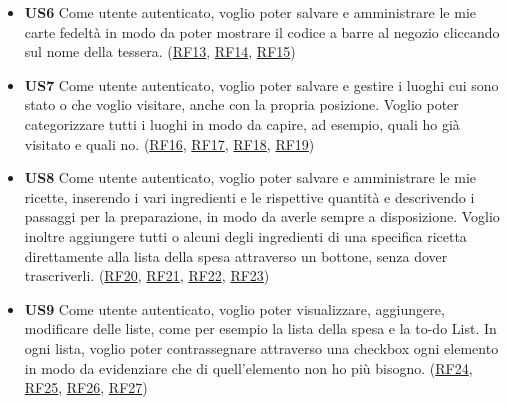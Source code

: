 \documentclass[a4paper,12pt]{article}
\begin{document}
\begin{itemize}
\item \textbf {US6} Come utente autenticato, voglio poter salvare e amministrare le mie carte fedeltà in modo da poter mostrare il codice a barre al negozio cliccando sul nome della tessera. (\hyperlink{RF13}{RF13}, \hyperlink{RF14}{RF14}, \hyperlink{RF15}{RF15})

\item \textbf {US7} Come utente autenticato, voglio poter salvare e gestire i luoghi cui sono stato o che voglio visitare, anche con la propria posizione. Voglio poter categorizzare tutti i luoghi in modo da capire, ad esempio, quali ho già visitato e quali no. (\hyperlink{RF16}{RF16}, \hyperlink{RF17}{RF17}, \hyperlink{RF18}{RF18}, \hyperlink{RF19}{RF19})

\item \textbf {US8}  Come utente autenticato, voglio poter salvare e amministrare le mie ricette, inserendo i vari ingredienti e le rispettive quantità e descrivendo i passaggi per la preparazione, in modo da averle sempre a disposizione. Voglio inoltre aggiungere tutti o alcuni degli ingredienti di una specifica ricetta direttamente alla lista della spesa attraverso un bottone, senza dover trascriverli. (\hyperlink{RF20}{RF20}, \hyperlink{RF21}{RF21}, \hyperlink{RF22}{RF22}, \hyperlink{RF23}{RF23})

\item \textbf {US9}  Come utente autenticato, voglio poter visualizzare, aggiungere, modificare delle liste, come per esempio la lista della spesa e la to-do List. In ogni lista, voglio poter contrassegnare attraverso una checkbox ogni elemento in modo da evidenziare che di quell'elemento non ho più bisogno. (\hyperlink{RF24}{RF24}, \hyperlink{RF25}{RF25}, \hyperlink{RF26}{RF26}, \hyperlink{RF27}{RF27})

\end{itemize}
\end{document}
